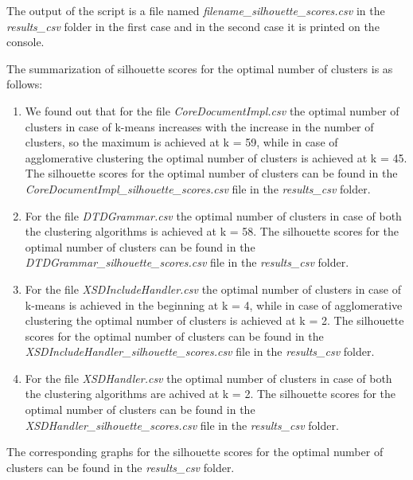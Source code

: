\documentclass{article}
\begin{document}
The output of the script is a file named \textit{filename\_silhouette\_scores.csv} in the \textit{results\_csv} folder in the first case and in the second case it is printed on the console.

The summarization of silhouette scores for the optimal number of clusters is as follows:
\begin{enumerate}
    \item We found out that for the file \textit{CoreDocumentImpl.csv} the optimal number of clusters in case of k-means increases with the increase in the number of clusters, so the maximum is achieved at k = 59, while in case of agglomerative clustering the optimal number of clusters is achieved at k = 45. The silhouette scores for the optimal number of clusters can be found in the \textit{CoreDocumentImpl\_silhouette\_scores.csv} file in the \textit{results\_csv} folder.
    \item For the file \textit{DTDGrammar.csv} the optimal number of clusters in case of both the clustering algorithms is achieved at k = 58. The silhouette scores for the optimal number of clusters can be found in the \textit{DTDGrammar\_silhouette\_scores.csv} file in the \textit{results\_csv} folder.
    \item For the file \textit{XSDIncludeHandler.csv} the optimal number of clusters in case of k-means is achieved in the beginning at k = 4, while in case of agglomerative clustering the optimal number of clusters is achieved at k = 2. The silhouette scores for the optimal number of clusters can be found in the \textit{XSDIncludeHandler\_silhouette\_scores.csv} file in the \textit{results\_csv} folder.
    \item For the file \textit{XSDHandler.csv} the optimal number of clusters in case of both the clustering algorithms are achived at k = 2. The silhouette scores for the optimal number of clusters can be found in the \textit{XSDHandler\_silhouette\_scores.csv} file in the \textit{results\_csv} folder.
\end{enumerate}
The corresponding graphs for the silhouette scores for the optimal number of clusters can be found in the \textit{results\_csv} folder.
\end{document}
